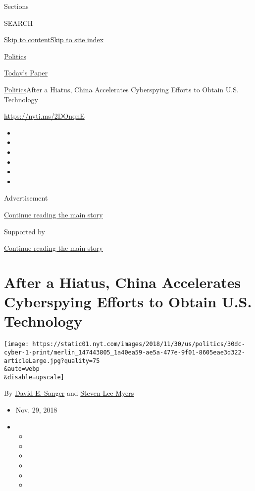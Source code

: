 Sections

SEARCH

\protect\hyperlink{site-content}{Skip to
content}\protect\hyperlink{site-index}{Skip to site index}

\href{https://www.nytimes.com/section/politics}{Politics}

\href{https://myaccount.nytimes.com/auth/login?response_type=cookie\&client_id=vi}{}

\href{https://www.nytimes.com/section/todayspaper}{Today's Paper}

\href{/section/politics}{Politics}\textbar{}After a Hiatus, China
Accelerates Cyberspying Efforts to Obtain U.S. Technology

\url{https://nyti.ms/2DOnqnE}

\begin{itemize}
\item
\item
\item
\item
\item
\item
\end{itemize}

Advertisement

\protect\hyperlink{after-top}{Continue reading the main story}

Supported by

\protect\hyperlink{after-sponsor}{Continue reading the main story}

\hypertarget{after-a-hiatus-china-accelerates-cyberspying-efforts-to-obtain-us-technology}{%
\section{After a Hiatus, China Accelerates Cyberspying Efforts to Obtain
U.S.
Technology}\label{after-a-hiatus-china-accelerates-cyberspying-efforts-to-obtain-us-technology}}

\texttt{[image: https://static01.nyt.com/images/2018/11/30/us/politics/30dc-cyber-1-print/merlin\_147443805\_1a40ea59-ae5a-477e-9f01-8605eae3d322-articleLarge.jpg?quality=75\\\&auto=webp\\\&disable=upscale]}

By \href{https://www.nytimes.com/by/david-e-sanger}{David E. Sanger} and
\href{https://www.nytimes.com/by/steven-lee-myers}{Steven Lee Myers}

\begin{itemize}
\item
  Nov. 29, 2018
\item
  \begin{itemize}
  \item
  \item
  \item
  \item
  \item
  \item
  \end{itemize}
\end{itemize}

